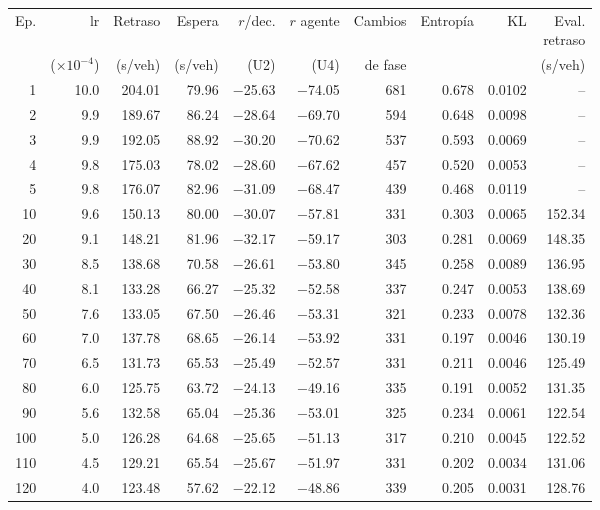 \begin{table}[H]
\centering
\scriptsize
\setlength{\tabcolsep}{3pt}
\setlength{\tabcolsep}{2pt}
\begin{tabular}{rrrrrrrrrr}
\toprule
Ep. & lr & Retraso & Espera & $r$/dec. & $r$ agente & Cambios & Entropía & KL & \makecell{Eval.\\retraso} \\
 & ($\times 10^{-4}$) & (s/veh) & (s/veh) & (U2) & (U4) & de fase &  &  & (s/veh) \\
\midrule
1 & 10.0 & 204.01 & 79.96 & $-$25.63 & $-$74.05 & 681 & 0.678 & 0.0102 & -- \\
2 & 9.9 & 189.67 & 86.24 & $-$28.64 & $-$69.70 & 594 & 0.648 & 0.0098 & -- \\
3 & 9.9 & 192.05 & 88.92 & $-$30.20 & $-$70.62 & 537 & 0.593 & 0.0069 & -- \\
4 & 9.8 & 175.03 & 78.02 & $-$28.60 & $-$67.62 & 457 & 0.520 & 0.0053 & -- \\
5 & 9.8 & 176.07 & 82.96 & $-$31.09 & $-$68.47 & 439 & 0.468 & 0.0119 & -- \\
10 & 9.6 & 150.13 & 80.00 & $-$30.07 & $-$57.81 & 331 & 0.303 & 0.0065 & 152.34 \\
20 & 9.1 & 148.21 & 81.96 & $-$32.17 & $-$59.17 & 303 & 0.281 & 0.0069 & 148.35 \\
30 & 8.5 & 138.68 & 70.58 & $-$26.61 & $-$53.80 & 345 & 0.258 & 0.0089 & 136.95 \\
40 & 8.1 & 133.28 & 66.27 & $-$25.32 & $-$52.58 & 337 & 0.247 & 0.0053 & 138.69 \\
50 & 7.6 & 133.05 & 67.50 & $-$26.46 & $-$53.31 & 321 & 0.233 & 0.0078 & 132.36 \\
60 & 7.0 & 137.78 & 68.65 & $-$26.14 & $-$53.92 & 331 & 0.197 & 0.0046 & 130.19 \\
70 & 6.5 & 131.73 & 65.53 & $-$25.49 & $-$52.57 & 331 & 0.211 & 0.0046 & 125.49 \\
80 & 6.0 & 125.75 & 63.72 & $-$24.13 & $-$49.16 & 335 & 0.191 & 0.0052 & 131.35 \\
90 & 5.6 & 132.58 & 65.04 & $-$25.36 & $-$53.01 & 325 & 0.234 & 0.0061 & 122.54 \\
100 & 5.0 & 126.28 & 64.68 & $-$25.65 & $-$51.13 & 317 & 0.210 & 0.0045 & 122.52 \\
110 & 4.5 & 129.21 & 65.54 & $-$25.67 & $-$51.97 & 331 & 0.202 & 0.0034 & 131.06 \\
120 & 4.0 & 123.48 & 57.62 & $-$22.12 & $-$48.86 & 339 & 0.205 & 0.0031 & 128.76 \\

\end{tabular}
\end{table}
